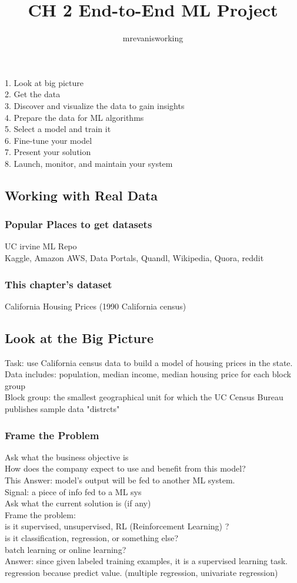 \documentclass[12pt]{article}
\begin{document}
\title{CH 2 End-to-End ML Project}
\author{mrevanisworking}
\maketitle

1. Look at big picture \\
2. Get the data \\
3. Discover and visualize the data to gain insights \\
4. Prepare the data for ML algorithms \\
5. Select a model and train it \\
6. Fine-tune your model \\
7. Present your solution \\
8. Launch, monitor, and maintain your system
\subsection{Working with Real Data}
	\subsubsection{Popular Places to get datasets}
		UC irvine ML Repo \\
		Kaggle, Amazon AWS, Data Portals, Quandl, Wikipedia, Quora, reddit
	\subsubsection{This chapter's dataset}
		California Housing Prices (1990 California census)
\subsection{Look at the Big Picture}
	Task: use California census data to build a model of housing prices
	in the state. \\
	Data includes: population, median income, median housing price
	for each block group\\
	Block group: the smallest geographical unit for which the UC Census
	Bureau publishes sample data "distrcts"
	\subsubsection{Frame the Problem}
		Ask what the business objective is \\
		How does the company expect to use and benefit from this model?\\
		This Answer: model's output will be fed to another ML system.\\
		Signal: a piece of info fed to a ML sys \\
		Ask what the current solution is (if any) \\
		Frame the problem:\\
		is it supervised, unsupervised, RL (Reinforcement Learning) ?\\
		is it classification, regression, or something else?\\
		batch learning or online learning?\\
		Answer: since given labeled training examples, it is a supervised learning
		task. regression because predict value. (multiple regression, 
		univariate regression)
\end{document}
